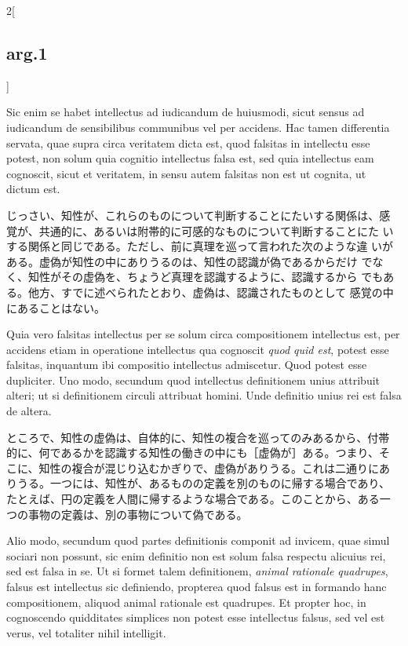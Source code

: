 \documentclass[paper=a4paper,fontsize=10pt,jafontsize=9pt,titlepage]{jlreq}
\begin{document}
\begin{paracol}{2}[\subsection{arg.1}]
\switchcolumn*


Sic enim se habet intellectus ad iudicandum de huiusmodi, sicut sensus
ad iudicandum de sensibilibus communibus vel per accidens. Hac tamen
differentia servata, quae supra circa veritatem dicta est, quod
falsitas in intellectu esse potest, non solum quia cognitio
intellectus falsa est, sed quia intellectus eam cognoscit, sicut et
veritatem, in sensu autem falsitas non est ut cognita, ut dictum est.

\switchcolumn

じっさい、知性が、これらのものについて判断することにたいする関係は、感
 覚が、共通的に、あるいは附帯的に可感的なものについて判断することにた
 いする関係と同じである。ただし、前に真理を巡って言われた次のような違
 いがある。虚偽が知性の中にありうるのは、知性の認識が偽であるからだけ
 でなく、知性がその虚偽を、ちょうど真理を認識するように、認識するから
 でもある。他方、すでに述べられたとおり、虚偽は、認識されたものとして
 感覚の中にあることはない。

\switchcolumn*


Quia vero falsitas intellectus per se solum circa compositionem
intellectus est, per accidens etiam in operatione intellectus qua
cognoscit {\itshape quod quid est}, potest esse falsitas, inquantum
ibi compositio intellectus admiscetur. Quod potest esse
dupliciter. Uno modo, secundum quod intellectus definitionem unius
attribuit alteri; ut si definitionem circuli attribuat homini. Unde
definitio unius rei est falsa de altera.

\switchcolumn

ところで、知性の虚偽は、自体的に、知性の複合を巡ってのみあるから、付帯
的に、何であるかを認識する知性の働きの中にも［虚偽が］ある。つまり、そ
こに、知性の複合が混じり込むかぎりで、虚偽がありうる。これは二通りにあ
りうる。一つには、知性が、あるものの定義を別のものに帰する場合であり、
たとえば、円の定義を人間に帰するような場合である。このことから、ある一
つの事物の定義は、別の事物について偽である。

\switchcolumn*


Alio modo, secundum quod partes definitionis componit ad invicem, quae
simul sociari non possunt, sic enim definitio non est solum falsa
respectu alicuius rei, sed est falsa in se. Ut si formet talem
definitionem, {\itshape animal rationale quadrupes}, falsus est
intellectus sic definiendo, propterea quod falsus est in formando hanc
compositionem, aliquod animal rationale est quadrupes. Et propter hoc,
in cognoscendo quidditates simplices non potest esse intellectus
falsus, sed vel est verus, vel totaliter nihil intelligit.


\end{paracol}
\end{document}
